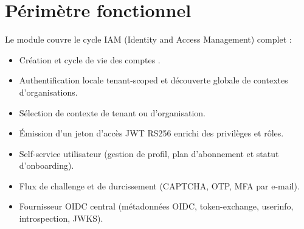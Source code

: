 \section{Périmètre fonctionnel}
Le module couvre le cycle IAM (Identity and Access Management) complet :
\begin{itemize}
  \item Création et cycle de vie des comptes .
  \item Authentification locale tenant-scoped et découverte globale de contextes d'organisations.
  \item Sélection de contexte de tenant ou d'organisation.
  \item Émission d'un jeton d'accès JWT RS256 enrichi des privilèges et rôles.
  \item Self-service utilisateur (gestion de profil, plan d'abonnement et statut d'onboarding).
  \item Flux de challenge et de durcissement (CAPTCHA, OTP, MFA par e-mail).
  \item Fournisseur OIDC central (métadonnées OIDC, token-exchange, userinfo, introspection, JWKS).
\end{itemize}
